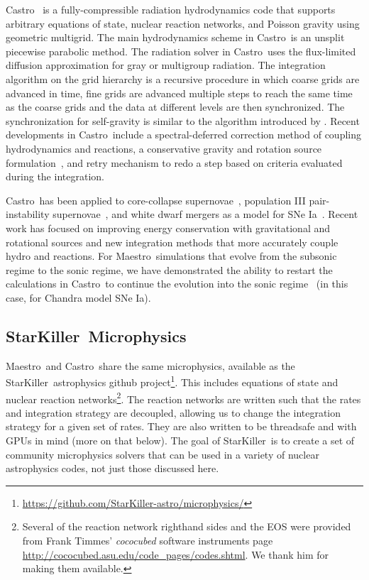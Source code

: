 \documentclass[a4paper]{jpconf}
\newcommand{\maestro}{{\sffamily Maestro}}
\newcommand{\castro}{{\sffamily Castro}}
\newcommand{\starkiller}{{\sffamily StarKiller}}
\newcommand{\MarginPar}[1]{\marginpar{\vskip-\baselineskip\raggedright\tiny\sffamily\hrule\smallskip{\color{red}#1}\par\smallskip\hrule}}
\begin{document}
\castro~\cite{castro,castroII,castroIII} is a fully-compressible
radiation hydrodynamics code that supports arbitrary equations of
state, nuclear reaction networks, and Poisson gravity using geometric
multigrid.  The main hydrodynamics scheme in \castro\ is an unsplit
piecewise parabolic method.  The radiation solver in \castro\ uses the
flux-limited diffusion approximation for gray or multigroup radiation.
The integration algorithm on the grid hierarchy is a recursive
procedure in which coarse grids are advanced in time, fine grids are
advanced multiple steps to reach the same time as the coarse grids and
the data at different levels are then synchronized. The
synchronization for self-gravity is similar to the algorithm
introduced by \cite{miniati-colella}.  Recent developments in
\castro\ include a spectral-deferred correction method of coupling
hydrodynamics and reactions, a conservative gravity and rotation
source formulation~\cite{wdmergerI}, and retry mechanism to redo a
step based on criteria evaluated during the integration.\MarginPar{more new stuff?}

\castro\ has been applied to core-collapse
supernovae~\cite{castro-ccsne}, population III pair-instability
supernovae~\cite{castro-pairinstability}, and white dwarf mergers as a
model for SNe Ia~\cite{wdmergerI}.  Recent work has focused on
improving energy conservation with gravitational and rotational
sources and new integration methods that more accurately couple hydro
and reactions.  For \maestro\ simulations that evolve from the
subsonic regime to the sonic regime, we have demonstrated the ability
to restart the calculations in \castro\ to continue the evolution into
the sonic regime~\cite{scidac-petascale,malone:2014} (in this case,
for Chandra model SNe Ia).

\subsection{\starkiller\ Microphysics}

\maestro\ and \castro\ share the same microphysics, available as the
\starkiller\ astrophysics github
project\footnote{\url{https://github.com/StarKiller-astro/microphysics/}}.
This includes equations of state and nuclear reaction
networks\footnote{Several of the reaction network righthand sides and
  the EOS were provided from Frank Timmes' {\em cococubed} software
  instruments page
  \url{http://cococubed.asu.edu/code_pages/codes.shtml}.  We thank him
  for making them available.}.  The reaction networks are written such
that the rates and integration strategy are decoupled, allowing us to
change the integration strategy for a given set of rates.  They are
also written to be threadsafe and with GPUs in mind (more on that
below).  The goal of \starkiller\ is to create a set of community
microphysics solvers that can be used in a variety of nuclear
astrophysics codes, not just those discussed here.
\end{document}
